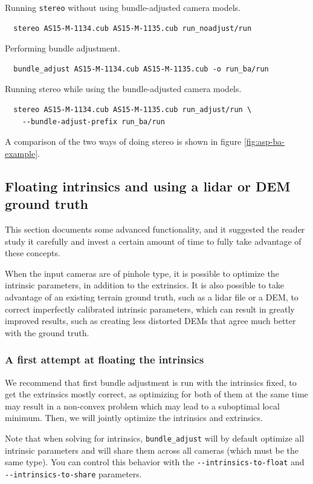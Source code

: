 Running \texttt{stereo} without using bundle-adjusted camera models.
\begin{verbatim}
  stereo AS15-M-1134.cub AS15-M-1135.cub run_noadjust/run
\end{verbatim}

Performing bundle adjustment.
\begin{verbatim}
  bundle_adjust AS15-M-1134.cub AS15-M-1135.cub -o run_ba/run
\end{verbatim}

Running stereo while using the bundle-adjusted camera models.
\begin{verbatim}
  stereo AS15-M-1134.cub AS15-M-1135.cub run_adjust/run \
    --bundle-adjust-prefix run_ba/run
\end{verbatim}

A comparison of the two ways of doing stereo is shown in figure \ref{fig:asp-ba-example}.

\subsection{Floating intrinsics and using a lidar or DEM ground truth}
\label{floatingintrinsics}

This section documents some advanced functionality, and it suggested the
reader study it carefully and invest a certain amount of time to fully
take advantage of these concepts.

When the input cameras are of pinhole type, it is possible to optimize
the intrinsic parameters, in addition to the extrinsics. It is also
possible to take advantage of an existing terrain ground truth, such as a lidar file or a DEM,
to correct imperfectly calibrated intrinsic parameters, which can result in greatly
improved results, such as creating less distorted DEMs that agree much better
with the ground truth. 

\subsubsection{A first attempt at floating the intrinsics}

We recommend that first bundle adjustment is run with the intrinsics fixed,
to get the extrinsics mostly correct, as optimizing for both of them at
the same time may result in a non-convex problem which may lead to a 
suboptimal local minimum. Then, we will jointly optimize the intrinsics
and extrinsics. 

Note that when solving for intrinsics, \texttt{bundle\_adjust} will by default
optimize all intrinsic parameters and will share them across all cameras (which must
be the same type).  You can control this behavior with the 
\texttt{-\/-intrinsics-to-float} and \texttt{-\/-intrinsics-to-share} parameters.

